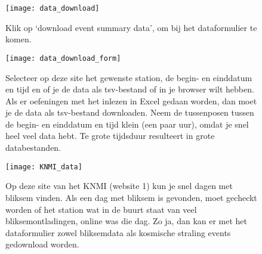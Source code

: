 \begin{figure}
    \centering
    \texttt{[image: data\_download]}
    \caption{Klik op `download event summary data', om bij het dataformulier te komen.}
    \label{fig:data_download}
\end{figure}

\begin{figure}
    \centering
    \texttt{[image: data\_download\_form]}
    \caption{Selecteer op deze site het gewenste station, de begin- en einddatum en tijd
     en of je de data als tsv-bestand of in je browser wilt hebben. Als er oefeningen met
     het inlezen in Excel gedaan worden, dan moet je de data als tsv-bestand downloaden.
     Neem de tussenposen tussen de begin- en einddatum en tijd klein (een paar uur),
     omdat je snel heel veel data hebt. Te grote tijdsduur resulteert in grote databestanden.}
    \label{fig:data_download_form}
\end{figure}


\begin{figure}
    \centering
    \texttt{[image: KNMI\_data]}
    \caption{Op deze site van het KNMI (website 1) kun je snel dagen met bliksem vinden. Als een dag
    met bliksem is gevonden, moet gecheckt worden of het \hisparc station wat in de
    buurt staat van veel bliksemontladingen, online was die dag. Zo ja, dan kan
    er met het dataformulier zowel bliksemdata als kosmische straling events
    gedownload worden.}
    \label{fig:KNMI_data}
\end{figure}



